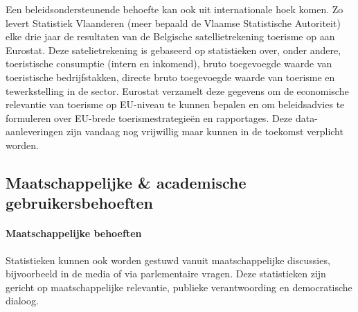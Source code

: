 \documentclass[\mainfiledir/00_handleiding_statistiekproductie.tex]{subfiles}
\begin{document}
Een beleidsondersteunende behoefte kan ook uit internationale hoek komen. Zo levert Statistiek Vlaanderen (meer bepaald de Vlaamse Statistische Autoriteit) elke drie jaar de resultaten van de Belgische satellietrekening toerisme op aan Eurostat. Deze satelietrekening is gebaseerd op statistieken over, onder andere, toeristische consumptie (intern en inkomend), bruto toegevoegde waarde van toeristische bedrijfstakken, directe bruto toegevoegde waarde van toerisme en tewerkstelling in de sector. Eurostat verzamelt deze gegevens om de economische relevantie van toerisme op EU-niveau te kunnen bepalen en om beleidsadvies te formuleren over EU-brede toerismestrategieën en rapportages. Deze data-aanleveringen zijn vandaag nog vrijwillig maar kunnen in de toekomst verplicht worden. 





\subsection[Maatschappelijke \& academische gebruikersbehoeften]{Maatschappelijke \& academische\\gebruikersbehoeften}


\paragraph{Maatschappelijke behoeften} 

Statistieken kunnen ook worden gestuwd vanuit maatschappelijke discussies, bijvoorbeeld in de media of via parlementaire vragen. Deze statistieken zijn gericht op maatschappelijke relevantie, publieke verantwoording en democratische dialoog. 
\end{document}
